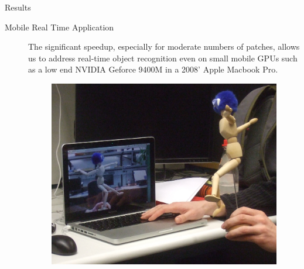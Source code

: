 \documentclass[final]{beamer}
\begin{document}
\begin{frame}{}
\begin{columns}[t]
\begin{column}{.48\linewidth}
\begin{block}{Results}
\begin{description}
\begin{figure}[htb]
		\end{figure}
		\item[Mobile Real Time Application]
		The significant speedup, especially for moderate numbers of patches, allows us to address real-time object recognition even on small mobile GPUs such as a low end NVIDIA Geforce 9400M in a 2008' Apple Macbook Pro.\\[.5em]
		    					\begin{figure}[htb]
 							    	\centering
	     					    \includegraphics[width=.6666\linewidth]{images/HS_2010-03-15_225559} \\
	     					\end{figure}


\end{description}
\end{block}
\end{column}
\end{columns}
\end{frame}
\end{document}

